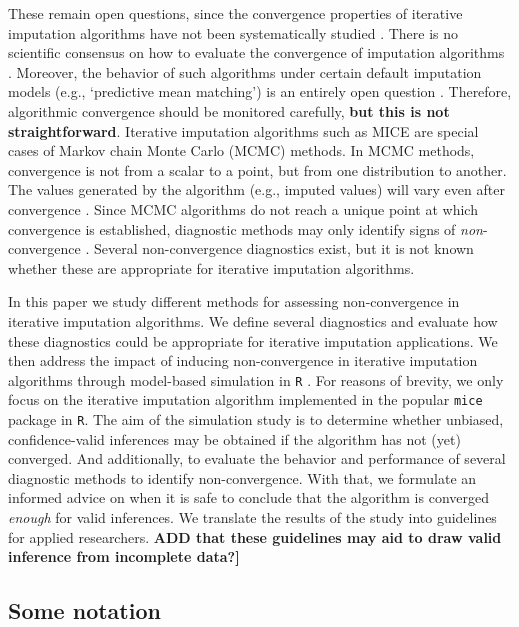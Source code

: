 \documentclass[Royal,times,sageh]{sagej}
\begin{document}
These remain open questions, since the convergence properties of iterative imputation algorithms have not been systematically studied \citep{zhu15, buur18}. There is no scientific consensus on how to evaluate the convergence of imputation algorithms \citep{taka17}. Moreover, the behavior of such algorithms under certain default imputation models (e.g., `predictive mean matching') is an entirely open question \citep{murr18}. Therefore, algorithmic convergence should be monitored carefully, \textbf{but this is not straightforward}. Iterative imputation algorithms such as MICE are special cases of Markov chain Monte Carlo (MCMC) methods. In MCMC methods, convergence is not from a scalar to a point, but from one distribution to another. The values generated by the algorithm (e.g., imputed values) will vary even after convergence \citep{gelm13}. Since MCMC algorithms do not reach a unique point at which convergence is established, diagnostic methods may only identify signs of \emph{non}-convergence \citep{hoff09}. Several non-convergence diagnostics exist, but it is not known whether these are appropriate for iterative imputation algorithms.

In this paper we study different methods for assessing non-convergence in iterative imputation algorithms. We define several diagnostics and evaluate how these diagnostics could be appropriate for iterative imputation applications. We then address the impact of inducing non-convergence in iterative imputation algorithms through model-based simulation in \texttt{R} \citep{R}. For reasons of brevity, we only focus on the iterative imputation algorithm implemented in the popular \texttt{mice} package \citep{mice} in \texttt{R}. The aim of the simulation study is to determine whether unbiased, confidence-valid inferences may be obtained if the algorithm has not (yet) converged. And additionally, to evaluate the behavior and performance of several diagnostic methods to identify non-convergence. With that, we formulate an informed advice on when it is safe to conclude that the algorithm is converged \emph{enough} for valid inferences. We translate the results of the study into guidelines for applied researchers. \textbf{ADD that these guidelines may aid to draw valid inference from incomplete data?{]}}

\hypertarget{some-notation}{%
\subsection{Some notation}\label{some-notation}}
\end{document}
